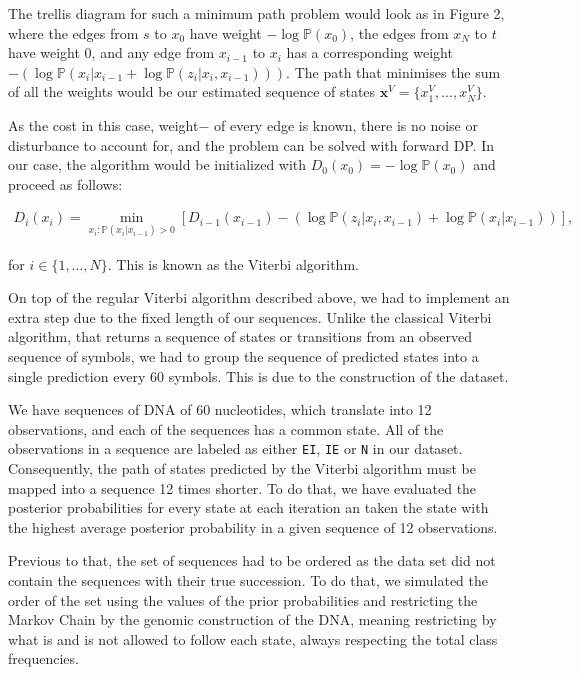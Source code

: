 \documentclass[a4paper, 11pt]{article} %
\begin{document}
The trellis diagram for such a minimum path problem would look as in Figure 2, where the edges from $s$ to $x_{0}$ have weight $-\log \mathbb{P}(x_{0})$, the edges from $x_{N}$ to $t$ have weight 0, and any edge from $x_{i-1}$ to $x_{i}$ has a corresponding weight $-\left( \log \mathbb{P}(x_{i}|x_{i-1} + \log \mathbb{P}(z_{i}|x_{i}, x_{i-1})) \right)$. The path that minimises the sum of all the weights would be our estimated sequence of states $\textbf{x}^V = \{ x_{1}^V, ..., x_N^V \}$.

As the cost \textendash in this case, weight$-$ of every edge is known, there is no noise or disturbance to account for, and the problem can be solved with forward DP. In our case, the algorithm would be initialized with $D_{0}(x_{0}) = -\log \mathbb{P}(x_{0})$ and proceed as follows:

\begin{eqnarray}
D_{i}(x_{i}) = \min_{ x_i: \mathbb{P}(x_i | x_{i-1}) > 0} \left[ D_{i-1}(x_{i-1}) - \left( \log \mathbb{P}(z_i | x_i, x_{i-1}) + \log \mathbb{P}(x_i | x_{i-1}) \right) \right],  \nonumber
\end{eqnarray}

for $i \in \{ 1, \dots, N \}$. This is known as the Viterbi algorithm.

On top of the regular Viterbi algorithm described above, we had to implement an extra step due to the fixed length of our sequences. Unlike the classical Viterbi algorithm, that returns a sequence of states or transitions from an observed sequence of symbols, we had to group the sequence of predicted states into a single prediction every 60 symbols. This is due to the construction of the dataset. 

We have sequences of DNA of 60 nucleotides, which translate into 12 observations, and each of the sequences has a common state. All of the observations in a sequence are labeled as either \texttt{EI}, \texttt{IE} or \texttt{N} in our dataset. Consequently, the path of states predicted by the Viterbi algorithm must be mapped into a sequence 12 times shorter. To do that, we have evaluated the posterior probabilities for every state at each iteration an taken the state with the highest average posterior probability in a given sequence of 12 observations.

Previous to that, the set of sequences had to be ordered as the data set did not contain the sequences with their true succession. To do that, we simulated the order of the set using the values of the prior probabilities and restricting the Markov Chain by the genomic construction of the DNA, meaning restricting by what is and is not allowed to follow each state, always respecting the total class frequencies.
\end{document}
